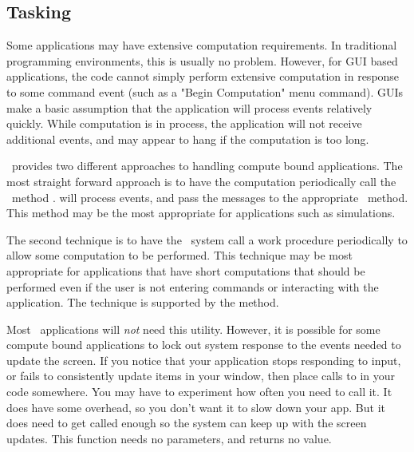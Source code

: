 \subsection* {Tasking} %

Some applications may have extensive computation requirements. In
traditional programming environments, this is usually no problem.
However, for GUI based applications, the code cannot simply
perform extensive computation in response to some command event
(such as a "Begin Computation" menu command). GUIs make a basic
assumption that the application will process events relatively
quickly. While computation is in process, the application will
not receive additional events, and may appear to hang if the
computation is too long.

\V\ provides two different approaches to handling compute bound
applications. The most straight forward approach is to have
the computation periodically call the \V\ method .
 will process events, and pass the messages to the
appropriate \V\ method. This method may be the most appropriate
for applications such as simulations.

The second technique is to have the \V\ system call a work procedure
periodically to allow some computation to be performed. This technique
may be most appropriate for applications that have short computations
that should be performed even if the user is not entering commands
or interacting with the application. The technique is supported by
the  method.


Most \V\ applications will \emph{not} need this utility. However, it is possible
for some compute bound applications to lock out system response to the
events needed to update the screen. If you notice that your application
stops responding to input, or fails to consistently update items
in your window, then place calls to  in
your code somewhere. You may have to experiment how often you need
to call it. It does have some overhead, so you don't want it to
slow down your app. But it does need to get called enough so the
system can keep up with the screen updates. This function needs
no parameters, and returns no value.


